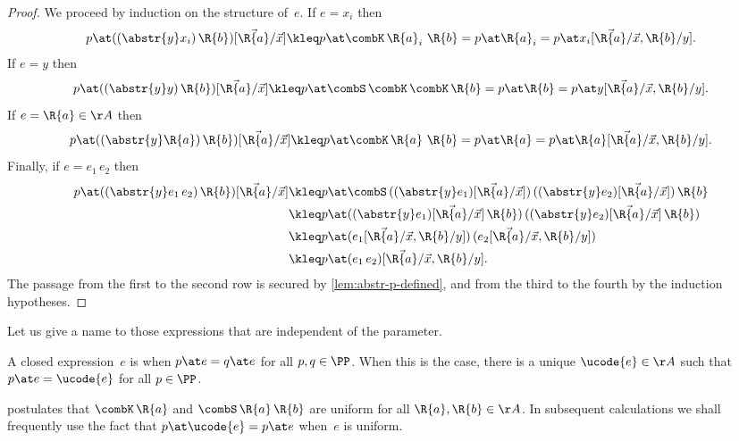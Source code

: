 \begin{proof}
  We proceed by induction on the structure of~$e$. If $e = x_i$ then
%
\begin{equation*}
  p \at ((\abstr{y} x_i) \, \R{b})[\vec{\R{a}}/\vec{x}] \kleq
  p \at \combK \, \R{a}_i \, \, \R{b} =
  p \at \R{a}_i =
  p \at x_i[\vec{\R{a}}/\vec{x}, \R{b}/y].
\end{equation*}
%
If $e = y$ then
%
\begin{equation*}
  p \at ((\abstr{y} y) \, \R{b})[\vec{\R{a}}/\vec{x}] \kleq
  p \at \combS \, \combK \, \combK \, \R{b} =
  p \at \R{b} =
  p \at y[\vec{\R{a}}/\vec{x}, \R{b}/y].
\end{equation*}
%
If $e = \R{a} \in \AA$ then
%
\begin{equation*}
  p \at ((\abstr{y} \R{a}) \, \R{b})[\vec{\R{a}}/\vec{x}] \kleq
  p \at \combK \, \R{a} \, \, \R{b} =
  p \at \R{a} =
  p \at \R{a}[\vec{\R{a}}/\vec{x}, \R{b}/y].
\end{equation*}
%
Finally, if $e = e_1 \, e_2$ then
%
\begin{align*}
  p \at ((\abstr{y} e_1 \, e_2) \, \R{b})[\vec{\R{a}}/\vec{x}]
  &\kleq
  p \at \combS \, ((\abstr{y} e_1)[\vec{\R{a}}/\vec{x}]) \, ((\abstr{y} e_2)[\vec{\R{a}}/\vec{x}]) \, \R{b} \\
  &\kleq
  p \at ((\abstr{y} e_1)[\vec{\R{a}}/\vec{x}] \, \R{b}) \, ((\abstr{y} e_2)[\vec{\R{a}}/\vec{x}] \, \R{b}) \\
  &\kleq
  p \at (e_1[\vec{\R{a}}/\vec{x},\R{b}/y]) \, (e_2[\vec{\R{a}}/\vec{x},\R{b}/y]) \\
  &\kleq
  p \at (e_1 \, e_2)[\vec{\R{a}}/\vec{x},\R{b}/y].
\end{align*}
%
The passage from the first to the second row is secured by \cref{lem:abstr-p-defined}, and from the third to the fourth by the induction hypotheses.
\end{proof}

Let us give a name to those expressions that are independent of the parameter.

\begin{definition}
  \label{def:uniform}%
  A closed expression~$e$ is  when $p \at e = q \at e$ for all $p, q \in \PP$.
  When this is the case, there is a unique $\ucode{e} \in \AA$ such that $p \at e = \ucode{e}$ for all $p \in \PP$.
\end{definition}

 postulates that $\combK \, \R{a}$ and $\combS \, \R{a} \, \R{b}$ are uniform for all $\R{a}, \R{b} \in \AA$. In subsequent calculations we shall frequently use the fact that $p \at \ucode{e} = p \at e$ when~$e$ is uniform.

